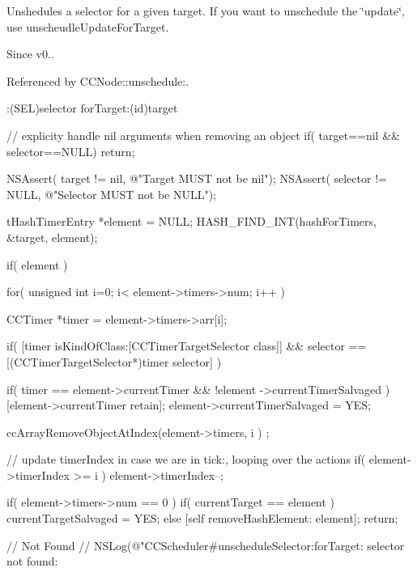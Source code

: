 Unshedules a selector for a given target. If you want to unschedule the \char`\"{}update\char`\"{}, use unscheudle\-Update\-For\-Target. \begin{DoxySince}{Since}
v0.. 
\end{DoxySince}


Referenced by C\-C\-Node\-::unschedule\-:.


\begin{DoxyCode}
                          :(SEL)selector forTarget:(id)target
{
        // explicity handle nil arguments when removing an object
        if( target==nil && selector==NULL)
                return;
        
        NSAssert( target != nil, @"Target MUST not be nil");
        NSAssert( selector != NULL, @"Selector MUST not be NULL");
        
        tHashTimerEntry *element = NULL;
        HASH_FIND_INT(hashForTimers, &target, element);
        
        if( element ) {
                
                for( unsigned int i=0; i< element->timers->num; i++ ) {
                        CCTimer *timer = element->timers->arr[i];
                        
                        
                        if( [timer isKindOfClass:[CCTimerTargetSelector class]]
       && selector == [(CCTimerTargetSelector*)timer selector] ) {
                                
                                if( timer == element->currentTimer && !element
      ->currentTimerSalvaged ) {
                                        [element->currentTimer retain];
                                        element->currentTimerSalvaged = YES;
                                }
                                
                                ccArrayRemoveObjectAtIndex(element->timers, i )
      ;
                                
                                // update timerIndex in case we are in tick:,
       looping over the actions
                                if( element->timerIndex >= i )
                                        element->timerIndex--;
                                
                                if( element->timers->num == 0 ) {
                                        if( currentTarget == element )
                                                currentTargetSalvaged = YES;
                                        else
                                                [self removeHashElement: 
      element];
                                }
                                return;
                        }
                }
        }
        
        // Not Found
        //      NSLog(@"CCScheduler#unscheduleSelector:forTarget: selector not
       found: %
        
}
\end{DoxyCode}
